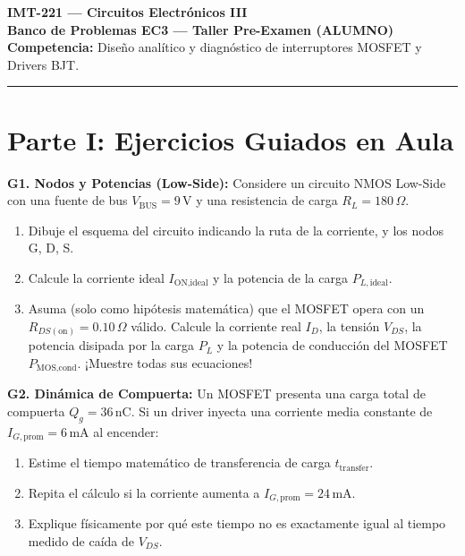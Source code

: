\documentclass[11pt, a4paper]{article}
\begin{document}
\noindent
{\LARGE \textbf{\textcolor{ucbblue}{IMT-221 — Circuitos Electrónicos III}}}\\[0.15cm]
{\Large \textbf{Banco de Problemas EC3 — Taller Pre-Examen (ALUMNO)}}\\[0.1cm]
{\small \textbf{Competencia:} Diseño analítico y diagnóstico de interruptores MOSFET y Drivers BJT.}
\par\vspace{0.2cm}\noindent\rule{\linewidth}{0.4pt}\vspace{0.3cm}

\section*{Parte I: Ejercicios Guiados en Aula}

\textbf{G1. Nodos y Potencias (Low-Side):} Considere un circuito NMOS Low-Side con una fuente de bus $V_{\text{BUS}} = 9\,\text{V}$ y una resistencia de carga $R_L = 180\,\Omega$. 
\begin{enumerate}[label=\alph*)]
    \item Dibuje el esquema del circuito indicando la ruta de la corriente, y los nodos G, D, S.
    \item Calcule la corriente ideal $I_{\text{ON,ideal}}$ y la potencia de la carga $P_{L,\text{ideal}}$.
    \item Asuma (solo como hipótesis matemática) que el MOSFET opera con un $R_{DS(\text{on})} = 0.10\,\Omega$ válido. Calcule la corriente real $I_D$, la tensión $V_{DS}$, la potencia disipada por la carga $P_L$ y la potencia de conducción del MOSFET $P_{\text{MOS,cond}}$. ¡Muestre todas sus ecuaciones!
\end{enumerate}
\vspace{4cm}

\textbf{G2. Dinámica de Compuerta:} Un MOSFET presenta una carga total de compuerta $Q_g = 36\,\text{nC}$. Si un driver inyecta una corriente media constante de $I_{G,\text{prom}} = 6\,\text{mA}$ al encender:
\begin{enumerate}[label=\alph*)]
    \item Estime el tiempo matemático de transferencia de carga $t_{\text{transfer}}$.
    \item Repita el cálculo si la corriente aumenta a $I_{G,\text{prom}} = 24\,\text{mA}$.
    \item Explique físicamente por qué este tiempo no es exactamente igual al tiempo medido de caída de $V_{DS}$.
\end{enumerate}
\vspace{3cm}
\end{document}
